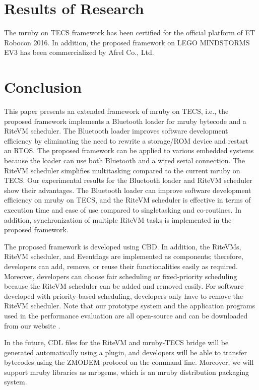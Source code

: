 \documentclass[S,R,E]{article/compsoft}
\begin{document}
\section{Results of Research}
\label{sec:}
The mruby on TECS framework has been certified for the official platform of ET Robocon 2016.
In addition, the proposed framework on LEGO MINDSTORMS EV3 has been commercialized by Afrel Co., Ltd.

 
\section{Conclusion}
\label{sec:Conclusion}
This paper presents an extended framework of mruby on TECS, i.e., the proposed framework implements a Bluetooth loader for mruby bytecode and a RiteVM scheduler.
The Bluetooth loader improves software development efficiency by eliminating the need to rewrite a storage/ROM device and restart an RTOS.
The proposed framework can be applied to various embedded systems because the loader can use both Bluetooth and a wired serial connection.
The RiteVM scheduler simplifies multitasking compared to the current mruby on TECS.
Our experimental results for the Bluetooth loader and RiteVM scheduler show their advantages.
The Bluetooth loader can improve software development efficiency on mruby on TECS, and the RiteVM scheduler is effective in terms of execution time and ease of use compared to singletasking and co-routines.
In addition, synchronization of multiple RiteVM tasks is implemented in the proposed framework.

The proposed framework is developed using CBD.
In addition, the RiteVMs, RiteVM scheduler, and Eventflags are implemented as components; therefore, developers can add, remove, or reuse their functionalities easily as required.
Moreover, developers can choose fair scheduling or fixed-priority scheduling because the RiteVM scheduler can be added and removed easily.
For software developed with priority-based scheduling, developers only have to remove the RiteVM scheduler.
Note that our prototype system and the application programs used in the performance evaluation are all open-source and can be downloaded from our website \cite{url:download}.

In the future, CDL files for the RiteVM and mruby-TECS bridge will be generated automatically using a plugin, and developers will be able to transfer bytecodes using the ZMODEM protocol on the command line.
Moreover, we will support mruby libraries as mrbgems, which is an mruby distribution packaging system.
\end{document}
